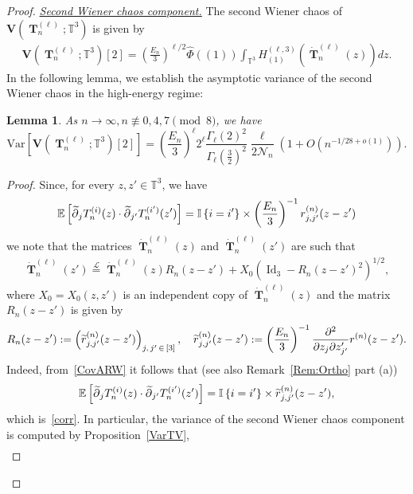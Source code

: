 \documentclass[10pt]{amsart}
\newtheorem{lemm}[theo]{Lemma}\newtheorem{prop}[theo]{Proposition}\newtheorem{coro}[theo]{Corollary}\newtheorem{conj}[theo]{Conjecture}
\theoremstyle{definition}\newtheorem{defi}[theo]{Definition}\newtheorem{rema}[theo]{Remark}\newtheorem{exam}[theo]{Example}\newtheorem{exem}[theo]{Example}\newtheorem{nota}[theo]{Notation}
\DeclareMathOperator{\Id}{Id}
\DeclareMathOperator{\bT}{\mathbf{T}}
\newcommand{\bfv}{\mathbf{V}}
\newcommand{\T}{\mathbb{T}^3}
\newcommand{\E}[1]{\mathbb{E}\left[#1\right]}
\newcommand{\V}[1]{\mathrm{Var}{\left[#1\right]}}
\newcommand{\eqLaw}{ \overset{\mathcal{L}}{=} }
\newcommand{\ind}[1]{\mathbb{I}
\left\{#1\right\}}
\newcommand{\notcon}[3]{ {#1} \not\equiv {#2} \pmod {#3} }
\newcommand{\Nn}{\mathcal{N}_n}
\let\oldtilde\tilde
\renewcommand*{\tilde}[1]{\mathchoice{\widetilde{#1}}{\widetilde{#1}}{\oldtilde{#1}}{\oldtilde{#1}}}
\begin{document}
\begin{proof}
\noindent\underline{\emph{Second Wiener chaos component.}} The second Wiener chaos of $\bfv(\bT_n^{(\ell)};\T)$ is given by
\begin{gather}\label{WC2}
\bfv\left(\bT_n^{(\ell)};\T\right)[2] =
\left(\frac{E_n}{3}\right)^{\ell/2} \widehat{\Phi}((1)) \int_{\T} H_{(1)}^{(\ell,3)}\left(\dot{\bT}_n^{(\ell)}(z)\right) dz.
\end{gather}
In the following lemma, we establish the asymptotic variance of the second Wiener chaos in the high-energy regime:
\begin{lemm}\label{Var2}
As $n\to \infty, \notcon{n}{0,4,7}{8}$, we have
\begin{equation*}
\V{\bfv\left(\bT_n^{(\ell)};\T\right)[2]}=
\left(\frac{E_n}{3}\right)^{\ell} 2^{\ell} \frac{\Gamma_{\ell}(2)^2}{\Gamma_{\ell}(\frac{3}{2})^2}
\frac{\ell}{2\Nn}\left(1 + O\left(n^{-1/28+o(1)}\right)\right).
\end{equation*}
\end{lemm}
\begin{proof}
Since, for every $z,z' \in \T$, we have
\begin{gather}\label{corr}
\E{ \tilde{\partial}_jT_n^{(i)}(z) \cdot \tilde{\partial}_{j'} T_n^{(i')}(z')} = \ind{i=i'} \times \left(\frac{E_n}{3}\right)^{-1} r^{(n)}_{j,j'}(z-z')
\end{gather}
we note that the matrices $\dot{\bT}_n^{(\ell)}(z)$ and $\dot{\bT}_n^{(\ell)}(z')$ are such that
\begin{gather}\label{CovARW}
\dot{\bT}_n^{(\ell)}(z')\eqLaw\dot{\bT}_n^{(\ell)}(z)R_n(z-z') +X_0\left(\Id_3-R_n(z-z')^2\right)^{1/2},
\end{gather}
where $X_0=X_0(z,z')$ is an independent copy of $\dot{\bT}_n^{(\ell)}(z)$ and the matrix $R_n(z-z')$ is given by
\begin{gather*}
R_n(z-z'):= \left(\tilde{r}^{(n)}_{j,j'}(z-z')\right)_{j,\,j'\,\in\,[3]}, \quad
\tilde{r}^{(n)}_{j,j'}(z-z'):=\left(\frac{E_n}{3}\right)^{-1} \frac{\partial^2}{\partial z_j \partial z'_{j'}} r^{(n)}(z-z').
\end{gather*}
Indeed, from~\eqref{CovARW} it follows that (see also Remark~\ref{Rem:Ortho} part (a))
\begin{gather*}
\E{ \tilde{\partial}_jT_n^{(i)}(z) \cdot \tilde{\partial}_{j'} T_n^{(i')}(z') } = \ind{i=i'} \times \tilde{r}^{(n)}_{j,j'}(z-z'),
\end{gather*}
which is~\eqref{corr}. In particular, the variance of the second Wiener chaos component is computed by Proposition~\ref{VarTV},
\begin{multline}\label{Var2TOT}

\end{multline}
\end{proof}
\end{proof}
\end{document}
